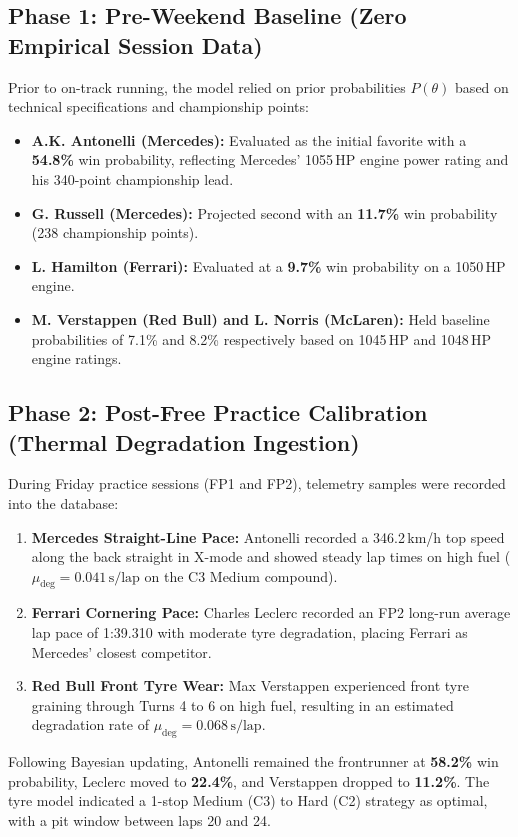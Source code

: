 \documentclass[12pt,a4paper]{report}
\begin{document}
\subsection{Phase 1: Pre-Weekend Baseline (Zero Empirical Session Data)}
Prior to on-track running, the model relied on prior probabilities $P(\theta)$ based on technical specifications and championship points:
\begin{itemize}
    \item \textbf{A.K. Antonelli (Mercedes):} Evaluated as the initial favorite with a \textbf{54.8\%} win probability, reflecting Mercedes' 1055\,HP engine power rating and his 340-point championship lead.
    \item \textbf{G. Russell (Mercedes):} Projected second with an \textbf{11.7\%} win probability (238 championship points).
    \item \textbf{L. Hamilton (Ferrari):} Evaluated at a \textbf{9.7\%} win probability on a 1050\,HP engine.
    \item \textbf{M. Verstappen (Red Bull) and L. Norris (McLaren):} Held baseline probabilities of 7.1\% and 8.2\% respectively based on 1045\,HP and 1048\,HP engine ratings.
\end{itemize}

\subsection{Phase 2: Post-Free Practice Calibration (Thermal Degradation Ingestion)}
During Friday practice sessions (FP1 and FP2), telemetry samples were recorded into the database:
\begin{enumerate}
    \item \textbf{Mercedes Straight-Line Pace:} Antonelli recorded a 346.2\,km/h top speed along the back straight in X-mode and showed steady lap times on high fuel ($\mu_{\text{deg}} = 0.041\,\text{s/lap}$ on the C3 Medium compound).
    \item \textbf{Ferrari Cornering Pace:} Charles Leclerc recorded an FP2 long-run average lap pace of 1:39.310 with moderate tyre degradation, placing Ferrari as Mercedes' closest competitor.
    \item \textbf{Red Bull Front Tyre Wear:} Max Verstappen experienced front tyre graining through Turns 4 to 6 on high fuel, resulting in an estimated degradation rate of $\mu_{\text{deg}} = 0.068\,\text{s/lap}$.
\end{enumerate}
Following Bayesian updating, Antonelli remained the frontrunner at \textbf{58.2\%} win probability, Leclerc moved to \textbf{22.4\%}, and Verstappen dropped to \textbf{11.2\%}. The tyre model indicated a 1-stop Medium (C3) to Hard (C2) strategy as optimal, with a pit window between laps 20 and 24.
\end{document}
